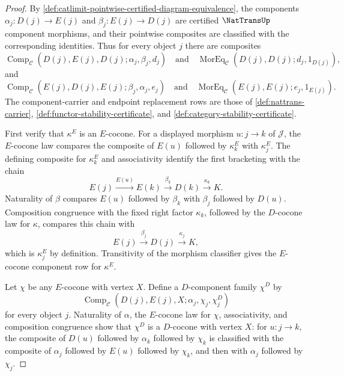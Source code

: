 \begin{proof}
By \autoref{def:catlimit-pointwise-certified-diagram-equivalence}, the components $\alpha_j:D(j)\to E(j)$ and $\beta_j:E(j)\to D(j)$ are certified $\NatTransUp$ component morphisms, and their pointwise composites are classified with the corresponding identities. Thus for every object $j$ there are composites
$$
\operatorname{Comp}_{\mathcal C}(D(j),E(j),D(j);\alpha_j,\beta_j,d_j)
\quad\text{and}\quad
\operatorname{MorEq}_{\mathcal C}(D(j),D(j);d_j,1_{D(j)}),
$$
and
$$
\operatorname{Comp}_{\mathcal C}(E(j),D(j),E(j);\beta_j,\alpha_j,e_j)
\quad\text{and}\quad
\operatorname{MorEq}_{\mathcal C}(E(j),E(j);e_j,1_{E(j)}).
$$
The component-carrier and endpoint replacement rows are those of \autoref{def:nattrans-carrier}, \autoref{def:functor-stability-certificate}, and \autoref{def:category-stability-certificate}.

First verify that $\kappa^E$ is an $E$-cocone. For a displayed morphism $u:j\to k$ of $\mathcal J$, the $E$-cocone law compares the composite of $E(u)$ followed by $\kappa^E_k$ with $\kappa^E_j$. The defining composite for $\kappa^E_k$ and associativity identify the first bracketing with the chain
$$
E(j)\xrightarrow{E(u)}E(k)\xrightarrow{\beta_k}D(k)\xrightarrow{\kappa_k}K.
$$
Naturality of $\beta$ compares $E(u)$ followed by $\beta_k$ with $\beta_j$ followed by $D(u)$. Composition congruence with the fixed right factor $\kappa_k$, followed by the $D$-cocone law for $\kappa$, compares this chain with
$$
E(j)\xrightarrow{\beta_j}D(j)\xrightarrow{\kappa_j}K,
$$
which is $\kappa^E_j$ by definition. Transitivity of the morphism classifier gives the $E$-cocone component row for $\kappa^E$.

Let $\chi$ be any $E$-cocone with vertex $X$. Define a $D$-component family $\chi^D$ by
$$
\operatorname{Comp}_{\mathcal C}(D(j),E(j),X;\alpha_j,\chi_j,\chi^D_j)
$$
for every object $j$. Naturality of $\alpha$, the $E$-cocone law for $\chi$, associativity, and composition congruence show that $\chi^D$ is a $D$-cocone with vertex $X$: for $u:j\to k$, the composite of $D(u)$ followed by $\alpha_k$ followed by $\chi_k$ is classified with the composite of $\alpha_j$ followed by $E(u)$ followed by $\chi_k$, and then with $\alpha_j$ followed by $\chi_j$.


\end{proof}
